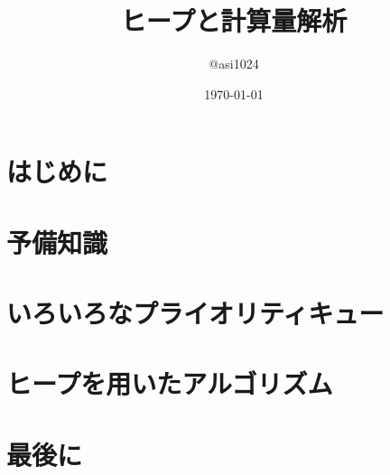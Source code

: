 \documentclass{beamer}
\title{ヒープと計算量解析}
\author{@asi1024}
\institute{Kyoto Univ. Informatics and Mathematical Science 2nd}
\date{\today}
\begin{document}
\frame{\titlepage}
\frame{
  \tableofcontents[sectionstyle=show,subsectionstyle=hide]
}

\section{はじめに}


\section{予備知識}



\section{いろいろなプライオリティキュー}





\section{ヒープを用いたアルゴリズム}


\section{最後に}

\end{document}
